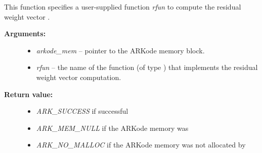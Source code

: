 \documentclass[letterpaper,10pt,english]{sphinxmanual}
\begin{document}
\begin{fulllineitems}
\label{c_interface/User_callable:c.ARKodeResFtolerance}
This function specifies a user-supplied function \emph{rfun} to compute
the residual weight vector .
\begin{description}
\item[{\textbf{Arguments:}}] \leavevmode\begin{itemize}
\item {} 
\emph{arkode\_mem} -- pointer to the ARKode memory block.

\item {} 
\emph{rfun} -- the name of the function (of type {\hyperref[c_interface/User_supplied:c.ARKRwtFn]{\emph{}}})
that implements the residual weight vector computation.

\end{itemize}

\item[{\textbf{Return value:}}] \leavevmode\begin{itemize}
\item {} 
\emph{ARK\_SUCCESS} if successful

\item {} 
\emph{ARK\_MEM\_NULL}  if the ARKode memory was 

\item {} 
\emph{ARK\_NO\_MALLOC}  if the ARKode memory was not allocated by {\hyperref[c_interface/User_callable:c.ARKodeInit]{\emph{}}}

\end{itemize}

\end{description}

\end{fulllineitems}
\end{document}

